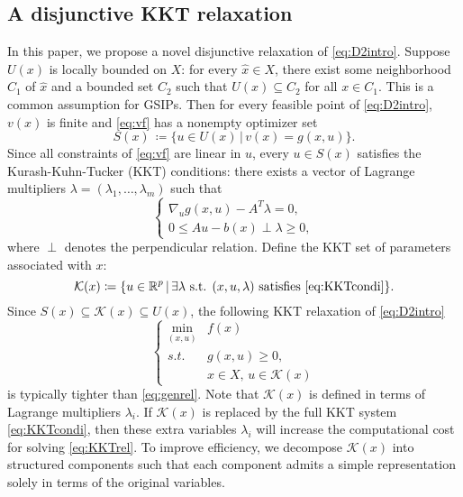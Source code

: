\documentclass{amsart}
\theoremstyle{plain}
\newcommand{\re}{\mathbb{R}}
\newcommand{\st}{\mathit{s.t.}}
\newcommand{\mc}[1]{\mathcal{#1}}
\numberwithin{equation}{section}
\begin{document}
	\subsection{A disjunctive KKT relaxation}
    In this paper, we propose a novel disjunctive relaxation of \eqref{eq:D2intro}.
	Suppose $U(x)$ is locally bounded on $X$: for every $\hat{x}\in X$, 
        there exist some neighborhood $C_1$ of $\hat{x}$ and 
	a bounded set $C_2$ such that $U(x)\subseteq C_2$ for all $x\in C_1$.
	This is a common assumption for GSIPs.
	Then for every feasible point of \eqref{eq:D2intro}, 
	$v(x)$ is finite and \eqref{eq:vf} has a nonempty optimizer set
	\begin{equation}\label{eq:S(x)}
		S(x)\,\coloneqq \{u\in U(x)\,\vert\, v(x) = g(x,u)\}.
	\end{equation}
	Since all constraints of \eqref{eq:vf} are linear in $u$, 
	every $u\in S(x)$ satisfies the Kurash-Kuhn-Tucker (KKT) conditions: 
	there exists a vector of Lagrange multipliers 
	$\lambda=(\lambda_1,\ldots, \lambda_m)$ such that
	\begin{equation}\label{eq:KKTcondi}
		\left\{\begin{array}{l}
			\nabla_u g(x,u)-A^T\lambda = 0,\\
			0\le Au-b(x)\perp \lambda\ge 0,
		\end{array}
		\right.
	\end{equation}
	where $\perp$ denotes the perpendicular relation.
	Define the KKT set of parameters associated with $x$:
    \[ \mc{K}(x)\coloneqq \{u\in\re^p\,\vert\, \exists \lambda\,\, 
        \mbox{s.t. $(x,u,\lambda)$ satisfies \eqref{eq:KKTcondi}}\}.\]
    Since $S(x)\subseteq \mc{K}(x)\subseteq U(x)$, 
        the following KKT relaxation of \eqref{eq:D2intro}
        \begin{equation}\label{eq:KKTrel}
	\left\{\begin{array}{cl}
			\min\limits_{(x,u)} & f(x)\\
			\st & g(x,u) \ge 0,\\
			& x\in X,\,u\in \mc{K}(x)
		\end{array}
		\right.
	\end{equation}
    is typically tighter than \eqref{eq:genrel}. Note that $\mc{K}(x)$ is defined
        in terms of Lagrange multipliers $\lambda_i$. If $\mc{K}(x)$ is replaced by the 
        full KKT system \eqref{eq:KKTcondi}, then these extra variables $\lambda_i$ will 
        increase the computational cost for solving \eqref{eq:KKTrel}. 
        To improve efficiency,
        we decompose $\mc{K}(x)$ into structured components such that
        each component admits a simple
        representation solely in terms of the original variables. 
\end{document}
